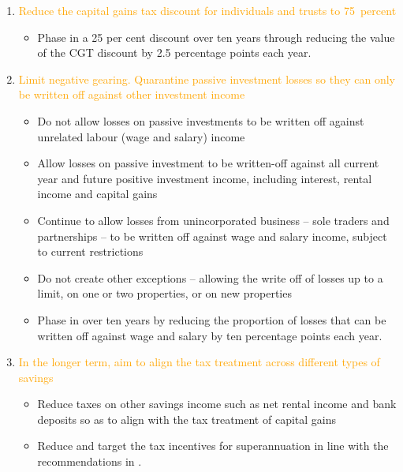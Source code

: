 \begin{recommendations}[-35pt]
\raggedright
\begin{enumerate}
\item \textcolor{Orange}{Reduce the capital gains tax discount for individuals and trusts to 75~percent} 
\begin{itemize}
  \item Phase in a 25 per cent discount over ten years through reducing the value of the CGT discount by 2.5 percentage points each year.
\end{itemize}
\item \textcolor{Orange}{Limit negative gearing. Quarantine passive investment losses so they can only be written off against other investment income}
\begin{itemize}
  \item 	Do not allow losses on passive investments to be written off against unrelated labour (wage and salary) income 
\item 	Allow losses on passive investment to be written-off against all current year and future positive investment income, including interest, rental income and capital gains 
\item 	Continue to allow losses from unincorporated business -- sole traders and partnerships -- to be written off against wage and salary income, subject to current restrictions
\item 	Do not create other exceptions -- allowing the write off of losses up to a limit, on one or two properties, or on new properties
\item 	Phase in over ten years by reducing the proportion of losses that can be written off against wage and salary by ten percentage points each year.
\end{itemize}
\pagebreak[2]
\item \textcolor{Orange}{In the longer term, aim to align the tax treatment across different types of savings}
\begin{itemize}
\item	Reduce taxes on other savings income such as net rental income and bank deposits so as to align with the tax treatment of capital gains
\item	Reduce and target the tax incentives for superannuation in line with the recommendations in .
\end{itemize}
\end{enumerate}

\end{recommendations}
